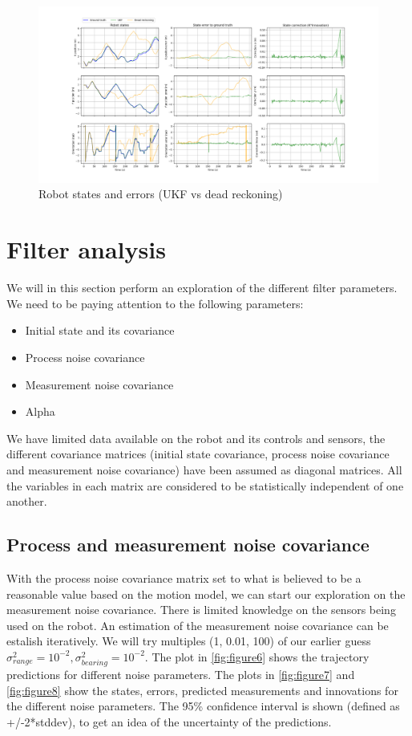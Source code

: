 \documentclass{article}
\begin{document}
\begin{figure}
\centering
\includegraphics[width=\textwidth]{Figure_5.png}
\caption{Robot states and errors (UKF vs dead reckoning)}
\end{figure}

\section{Filter analysis}
We will in this section perform an exploration of the different filter parameters. We need to be paying attention to the following parameters:
\begin{itemize}
      \item Initial state and its covariance
      \item Process noise covariance
      \item Measurement noise covariance
      \item Alpha
\end{itemize}

We have limited data available on the robot and its controls and sensors, the different covariance matrices (initial state covariance, process noise covariance and measurement noise covariance) have been assumed as diagonal matrices. All the variables in each matrix are considered to be statistically independent of one another.


\subsection{Process and measurement noise covariance}
With the process noise covariance matrix set to what is believed to be a reasonable value based on the motion model, we can start our exploration on the measurement noise covariance. There is limited knowledge on the sensors being used on the robot.
An estimation of the measurement noise covariance can be estalish iteratively. We will try multiples (1, 0.01, 100) of our earlier guess $\sigma_{range}^2=10^{-2}, \sigma_{bearing}^2=10^{-2}$. The plot in \autoref{fig:figure6} shows the trajectory predictions for different noise parameters. The plots in \autoref{fig:figure7} and \autoref{fig:figure8} show the states, errors, predicted measurements and innovations for the different noise parameters. The 95\% confidence interval is shown (defined as +/-2*stddev), to get an idea of the uncertainty of the predictions.
\end{document}
